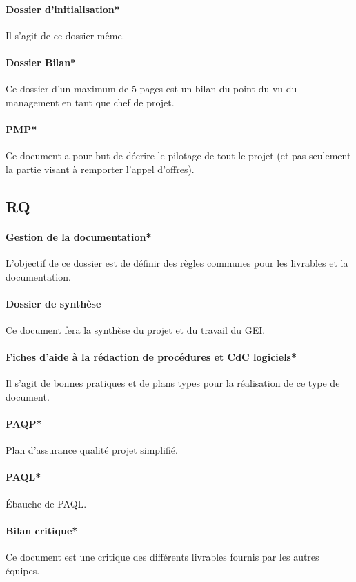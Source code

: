 \documentclass[a4paper, 11pt, draft]{report}
\begin{document}
        \paragraph{Dossier d'initialisation*} Il s'agit de ce dossier même.
        \paragraph{Dossier Bilan*} Ce dossier d'un maximum de 5 pages est un bilan du point du vu du management en tant que chef de projet.
        \paragraph{PMP*} Ce document a pour but de décrire le pilotage de tout le projet (et pas seulement la partie visant à remporter l'appel d'offres).
    \subsection{RQ}
        \paragraph{Gestion de la documentation*} L'objectif de ce dossier est de définir des règles communes pour les livrables et la documentation.
        \paragraph{Dossier de synthèse} Ce document fera la synthèse du projet et du travail du GEI.
        \paragraph{Fiches d'aide à la rédaction de procédures et CdC logiciels*} Il s'agit de bonnes pratiques et de plans types pour la réalisation de ce type de document.
        \paragraph{PAQP*} Plan d'assurance qualité projet simplifié.
        \paragraph{PAQL*} Ébauche de PAQL.
        \paragraph{Bilan critique*} Ce document est une critique des différents livrables fournis par les autres équipes.
\end{document}
